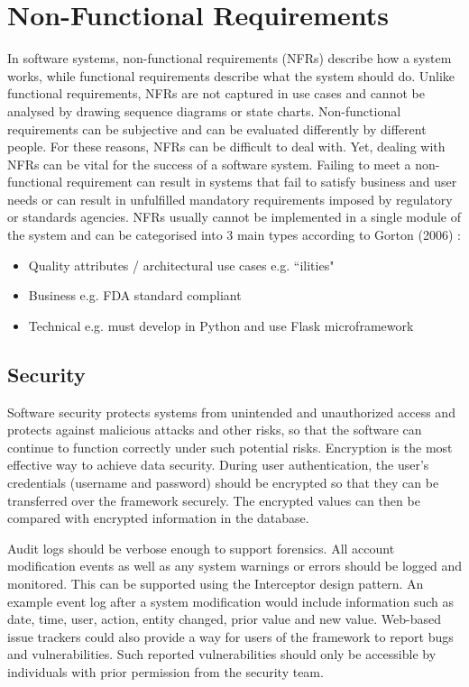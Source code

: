 \section{Non-Functional Requirements}

In software systems, non-functional requirements (NFRs) describe how a system works, while functional requirements describe what the system should do. Unlike functional requirements, NFRs are not captured in use cases and cannot be analysed by drawing sequence diagrams or state charts. Non-functional requirements can be subjective and can be evaluated differently by different people. For these reasons, NFRs can be difficult to deal with. Yet, dealing with NFRs can be vital for the success of a software system. \cite{nfrs} Failing to meet a non-functional requirement can result in systems that fail to satisfy business and user needs or can result in unfulfilled mandatory requirements imposed by regulatory or standards agencies. NFRs usually cannot be implemented in a single module of the system and can be categorised into 3 main types according to Gorton (2006) \cite{sw-arch}:
\begin{itemize}
  \item Quality attributes / architectural use cases e.g. ``ilities"
  \item Business e.g. FDA standard compliant
  \item Technical e.g. must develop in Python and use Flask microframework
\end{itemize}

\subsection{Security}
Software security protects systems from unintended and unauthorized access and protects against malicious attacks and other risks, so that the software can continue to function correctly under such potential risks. Encryption is the most effective way to achieve data security. During user authentication, the user's credentials (username and password) should be encrypted so that they can be transferred over the framework securely. The encrypted values can then be compared with encrypted information in the database.

Audit logs should be verbose enough to support forensics. All account modification events as well as any system warnings or errors should be logged and monitored. This can be supported using the Interceptor design pattern. An example event log after a system modification would include information such as date, time, user, action, entity changed, prior value and new value. Web-based issue trackers could also provide a way for users of the framework to report bugs and vulnerabilities. Such reported vulnerabilities should only be accessible by individuals with prior permission from the security team.


